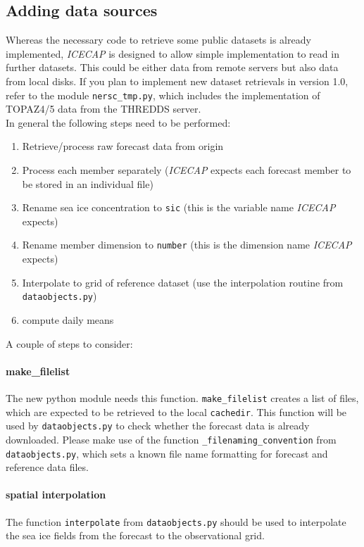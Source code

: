 \documentclass[DIV=10, parskip=full]{scrreprt}
\newcommand{\ice}{\textit{ICECAP}\xspace}
\newcommand{\version}{1.0\xspace}
\begin{document}
\subsection{Adding data sources}
Whereas the necessary code to retrieve some public datasets is already implemented, \ice is designed to allow simple implementation to read in further datasets. This could be either data from remote servers but also data from local disks. If you plan to implement new dataset retrievals in version \version, refer to the module \texttt{nersc\_tmp.py}, which includes the implementation of TOPAZ4/5 data from the THREDDS server. \\

In general the following steps need to be performed:
\begin{enumerate}
	\item Retrieve/process raw forecast data from origin
	\item Process each member separately (\ice expects each forecast member to be stored in an individual file)
	\item  Rename sea ice concentration to \texttt{sic} (this is the variable name \ice expects)
	\item Rename member dimension to \texttt{number} (this is the dimension name \ice expects)
	\item Interpolate to grid of reference dataset (use the interpolation routine from \texttt{dataobjects.py})
	\item compute daily means
\end{enumerate}

A couple of steps to consider: 

\paragraph{make\_filelist}
The new python module needs this function. \texttt{make\_filelist} creates a list of files, which are expected to be retrieved to the local \texttt{cachedir}. This function will be used by \texttt{dataobjects.py} to check whether the forecast data is already downloaded. Please make use of the function \texttt{\_filenaming\_convention} from  \texttt{dataobjects.py}, which sets a known file name formatting for forecast and reference data files. 

\paragraph{spatial interpolation}
The function  \texttt{interpolate} from  \texttt{dataobjects.py} should be used to interpolate the sea ice fields from the forecast to the observational grid. 
\end{document}
